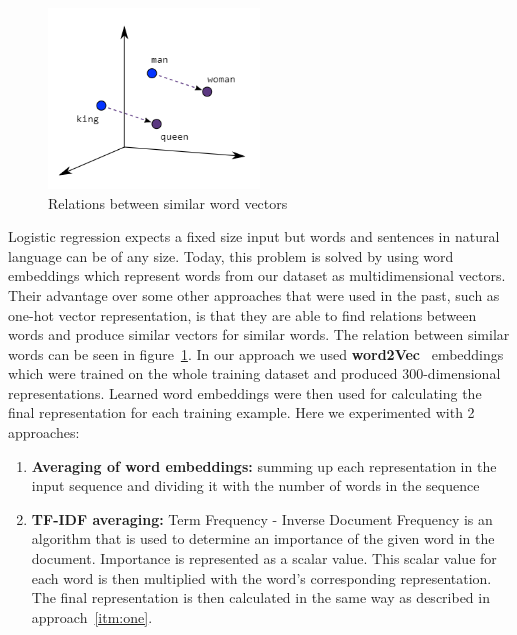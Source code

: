 \documentclass[10pt, a4paper]{article}
\begin{document}
\begin{figure}[h]
    \centering
    \includegraphics[width=0.5\textwidth]{images/embeddings}
    \caption{Relations between similar word vectors}
    \label{fig:embedding}
\end{figure}
\hfill \break
Logistic regression expects a fixed size input but words and sentences in natural language can be of any size.
Today, this problem is solved by using word embeddings which represent words from our dataset as multidimensional vectors.
Their advantage over some other approaches that were used in the past, such as one-hot vector representation, is that they are able to find relations between words and produce similar vectors for similar words.
The relation between similar words can be seen in figure~\ref{fig:embedding}.
In our approach we used \textbf{word2Vec}~\citep{mikolov2013efficient} embeddings which were trained on the whole training dataset and produced 300-dimensional representations.
Learned word embeddings were then used for calculating the final representation for each training example.
Here we experimented with 2 approaches:
\begin{enumerate}
    \item \label{itm:one} \textbf{Averaging of word embeddings:} summing up each representation in the input sequence and dividing it with the number of words in the sequence
    \item \textbf{TF-IDF averaging:} Term Frequency - Inverse Document Frequency is an algorithm that is used to determine an importance of the given word in the document.
    Importance is represented as a scalar value.
     This scalar value for each word is then multiplied with the word's corresponding representation.
    The final representation is then calculated in the same way as described in approach~\ref{itm:one}.

\end{enumerate}
\end{document}
